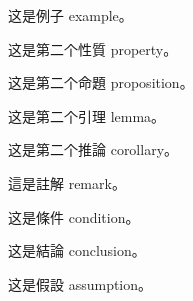 \documentclass[
    writingLanguage=chinese,
    addPageTitle=on,
    addDeclaration=on,
    addMUSTlog=off,
    printing=off,
    refIndent=on,
    addFigTOC=on,
    addTabTOC=on,
]{.def/must}
\begin{document}
\begin{example}
这是例子 example。
\end{example}



\begin{property}
这是第二个性質 property。
\end{property}

\begin{proposition}
这是第二个命題 proposition。
\end{proposition}


\begin{lemma}
这是第二个引理 lemma。
\end{lemma}

\begin{corollary}
这是第二个推論 corollary。
\end{corollary}

\begin{remark}
這是註解 remark。
\end{remark}



\begin{condition}
这是條件 condition。
\end{condition}



\begin{conclusion}
这是結論 conclusion。
\end{conclusion}


\begin{assumption}
这是假設 assumption。
\end{assumption}
\end{document}
